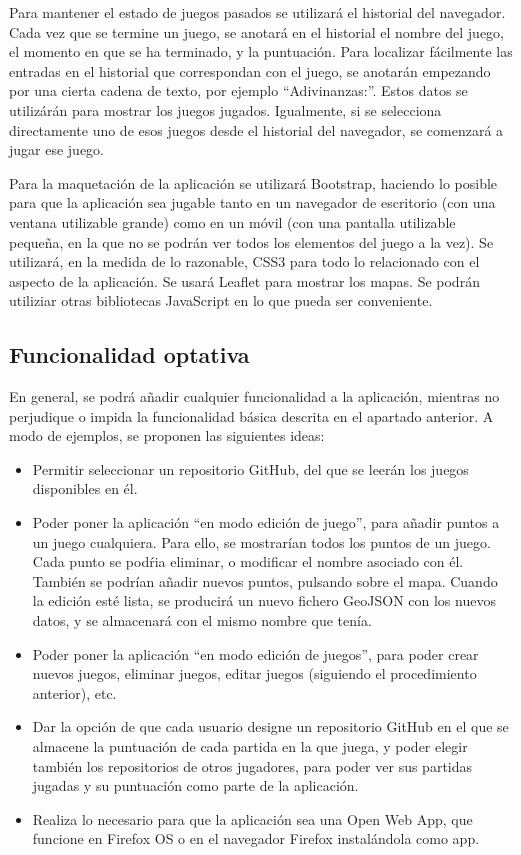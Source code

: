 Para mantener el estado de juegos pasados se utilizará el historial del navegador. Cada vez que se termine un juego, se anotará en el historial el nombre del juego, el momento en que se ha terminado, y la puntuación. Para localizar fácilmente las entradas en el historial que correspondan con el juego, se anotarán empezando por una cierta cadena de texto, por ejemplo ``Adivinanzas:''. Estos datos se utilizárán para mostrar los juegos jugados. Igualmente, si se selecciona directamente uno de esos juegos desde el historial del navegador, se comenzará a jugar ese juego.

Para la maquetación de la aplicación se utilizará Bootstrap, haciendo lo posible para que la aplicación sea jugable tanto en un navegador de escritorio (con una ventana utilizable grande) como en un móvil (con una pantalla utilizable pequeña, en la que no se podrán ver todos los elementos del juego a la vez). Se utilizará, en la medida de lo razonable, CSS3 para todo lo relacionado con el aspecto de la aplicación. Se usará Leaflet para mostrar los mapas. Se podrán utiliziar otras bibliotecas JavaScript en lo que pueda ser conveniente.

\subsection{Funcionalidad optativa}

En general, se podrá añadir cualquier funcionalidad a la aplicación, mientras no perjudique o impida la funcionalidad básica descrita en el apartado anterior. A modo de ejemplos, se proponen las siguientes ideas:

\begin{itemize}
\item Permitir seleccionar un repositorio GitHub, del que se leerán los juegos disponibles en él.
\item Poder poner la aplicación ``en modo edición de juego'', para añadir puntos a un juego cualquiera. Para ello, se mostrarían todos los puntos de un juego. Cada punto se podŕia eliminar, o modificar el nombre asociado con él. También se podrían añadir nuevos puntos, pulsando sobre el mapa. Cuando la edición esté lista, se producirá un nuevo fichero GeoJSON con los nuevos datos, y se almacenará con el mismo nombre que tenía.
\item Poder poner la aplicación ``en modo edición de juegos'', para poder crear nuevos juegos, eliminar juegos, editar juegos (siguiendo el procedimiento anterior), etc.
\item Dar la opción de que cada usuario designe un repositorio GitHub en el que se almacene la puntuación de cada partida en la que juega, y poder elegir también los repositorios de otros jugadores, para poder ver sus partidas jugadas y su puntuación como parte de la aplicación.
\item Realiza lo necesario para que la aplicación sea una Open Web App, que funcione en Firefox OS o en el navegador Firefox instalándola como app.
\end{itemize}

